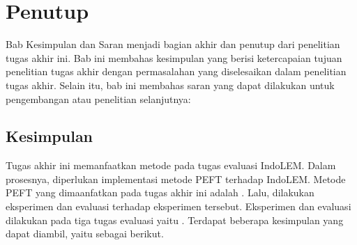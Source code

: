 \chapter{Penutup}

Bab Kesimpulan dan Saran  menjadi bagian akhir dan penutup dari penelitian tugas akhir ini. Bab ini  membahas kesimpulan yang berisi ketercapaian tujuan penelitian tugas akhir dengan permasalahan yang diselesaikan dalam penelitian tugas akhir. Selain itu, bab ini  membahas saran yang dapat dilakukan untuk pengembangan atau penelitian selanjutnya:

\section{Kesimpulan}

Tugas akhir ini memanfaatkan metode \PEFT pada tugas evaluasi IndoLEM. Dalam prosesnya, diperlukan implementasi metode PEFT terhadap IndoLEM. Metode PEFT yang dimaanfatkan pada tugas akhir ini adalah \methodPEFT. Lalu, dilakukan eksperimen dan evaluasi terhadap eksperimen tersebut. Eksperimen dan evaluasi dilakukan pada tiga tugas evaluasi yaitu \nlptask. Terdapat beberapa kesimpulan yang dapat diambil, yaitu sebagai berikut.

